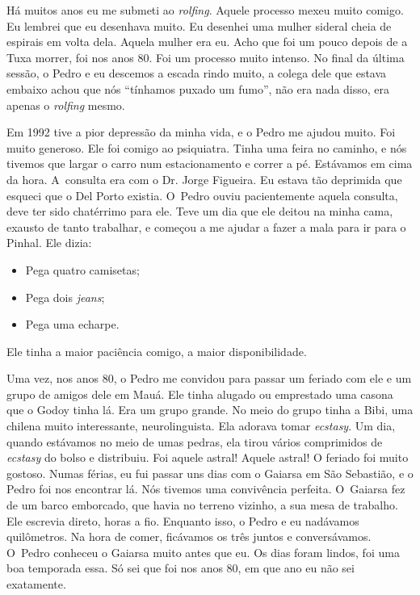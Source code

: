 Há muitos anos eu me submeti ao \emph{rolfing}. Aquele processo
mexeu muito comigo. Eu lembrei que eu desenhava muito. Eu desenhei uma
mulher sideral cheia de espirais em volta dela. Aquela mulher era eu.
Acho que foi um pouco depois de a Tuxa morrer, foi nos anos 80. Foi um
processo muito intenso. No final da última sessão, o Pedro e eu descemos
a escada rindo muito, a colega dele que estava embaixo achou que nós
``tínhamos puxado um fumo'', não era nada disso, era apenas o
\emph{rolfing} mesmo.

Em 1992 tive a pior depressão da minha vida, e o Pedro me ajudou muito.
Foi muito generoso. Ele foi comigo ao psiquiatra. Tinha uma feira no
caminho, e nós tivemos que largar o carro num estacionamento e correr a
pé. Estávamos em cima da hora. A~consulta era com o Dr. Jorge Figueira.
Eu estava tão deprimida que esqueci que o Del Porto existia. O~Pedro
ouviu pacientemente aquela consulta, deve ter sido chatérrimo para ele.
Teve um dia que ele deitou na minha cama, exausto de tanto trabalhar, e
começou a me ajudar a fazer a mala para ir para o Pinhal. Ele dizia:

\begin{itemize}
\item
  Pega quatro camisetas;
\item
  Pega dois \emph{jeans};
\item
  Pega uma echarpe.
\end{itemize}
Ele tinha a maior paciência comigo, a maior disponibilidade.

Uma vez, nos anos 80, o Pedro me convidou para passar um feriado com ele
e um grupo de amigos dele em Mauá. Ele tinha alugado ou emprestado uma
casona que o Godoy tinha lá. Era um grupo grande. No meio do grupo tinha
a Bibi, uma chilena muito interessante, neurolinguista. Ela adorava
tomar \emph{ecstasy}. Um dia, quando estávamos no meio de umas pedras,
ela tirou vários comprimidos de \emph{ecstasy} do bolso e distribuiu.
Foi aquele astral! Aquele astral! O feriado foi muito gostoso. Numas
férias, eu fui passar uns dias com o Gaiarsa em São Sebastião, e o Pedro
foi nos encontrar lá. Nós tivemos uma convivência perfeita. O~Gaiarsa
fez de um barco emborcado, que havia no terreno vizinho, a sua mesa de
trabalho. Ele escrevia direto, horas a fio. Enquanto isso, o Pedro e eu
nadávamos quilômetros. Na hora de comer, ficávamos os três juntos e
conversávamos. O~Pedro conheceu o Gaiarsa muito antes que eu. Os dias
foram lindos, foi uma boa temporada essa. Só sei que foi nos anos 80, em
que ano eu não sei exatamente.

